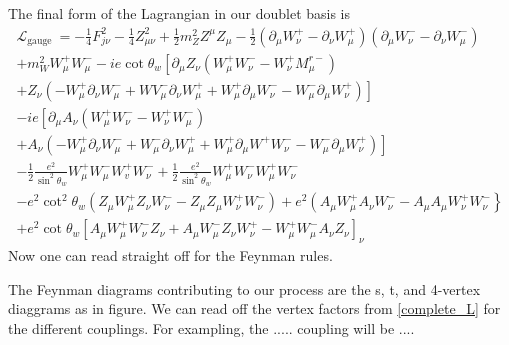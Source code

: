 \documentclass[11pt]{article}
\begin{document}
{The final form of the Lagrangian  in our doublet basis is 
\begin{equation}
    \begin{array}{l}
\mathcal{L}_{\text {gauge }}=-\frac{1}{4} F_{j \nu}^{2}-\frac{1}{4} Z_{\mu \nu}^{2}+\frac{1}{2} m_{Z}^{2} Z^{\mu} Z_{\mu}-\frac{1}{2}\left(\partial_{\mu} W_{\nu}^{+}-\partial_{\nu} W_{\mu}^{+}\right)\left(\partial_{\mu} W_{\nu}^{-}-\partial_{\nu} W_{\mu}^{-}\right)\\
+m_{W}^{2} W_{\mu}^{+} W_{\mu}^{-}-i e \cot \theta_{w}\left[\partial_{\mu} Z_{\nu}\left(W_{\mu}^{+} W_{\nu}^{-}-W_{\nu}^{+} M_{\mu}^{r-}\right)\right.\\
\left.+Z_{\nu}\left(-W_{\mu}^{+} \partial_{\nu} W_{\mu}^{-}+W V_{\mu}^{-} \partial_{\nu} W_{\mu}^{+}+W_{\mu}^{+} \partial_{\mu} W_{\nu}^{-}-W_{\mu}^{-} \partial_{\mu} W_{\nu}^{+}\right)\right]\\
-i e\left[\partial_{\mu} A_{\nu}\left(W_{\mu}^{+} W_{\nu}^{-}-W_{\nu}^{+} W_{\mu}^{-}\right)\right.\\
\left.+A_{\nu}\left(-W_{\mu}^{+} \partial_{\nu} W_{\mu}^{-}+W_{\mu}^{-} \partial_{\nu} W_{\mu}^{+}+W_{\mu}^{+} \partial_{\mu} W^+ W_{\nu}^{-}-W_{\mu}^{-} \partial_{\mu} W_{\nu}^{+}\right)\right]\\
-\frac{1}{2} \frac{e^{2}}{\sin ^{2} \theta_{w}} W_{\mu}^{+} W_{\mu}^{-} W_{v}^{+} W_{\nu}^{-}+\frac{1}{2} \frac{e^{2}}{\sin ^{2} \theta_{w}} W_{\mu}^{+} W_{\nu}^{-} W_{\mu}^{+} W_{\nu}^{-}\\
-e^{2} \cot ^{2} \theta_{w}\left(Z_{\mu} W_{\mu}^{+} Z_{\nu} W_{\nu}^{-}-Z_{\mu} Z_{\mu} W_{\nu}^{+} W_{\nu}^{-}\right)+e^{2}\left(A_{\mu } W_{\mu}^{+} A_{\nu} W_{\nu}^{-}-A_{\mu} A_{\mu} W_{\nu}^{+} W_{\nu}^{-}\right\}\\
+e^{2} \cot \theta_{w}\left[A_{\mu} W_{\mu}^{+} W_{\nu}^{-} Z_{\nu}+A_{\mu} W_{\mu}^{-} Z_{\nu} W_{\nu}^{+}-W_{\mu}^{+} W_{\mu }^{-} A_{\nu} Z_{\nu}\right]_{\nu}
\label{complete_L}
\end{array}
\end{equation}
Now one can read straight off for the Feynman rules. 

The Feynman diagrams contributing to our process are the s, t, and 4-vertex diaggrams as in figure. We can read off the vertex factors from \ref{complete_L} for the different couplings. For exampling, the ..... coupling will be ....
\\




}
\end{document}
